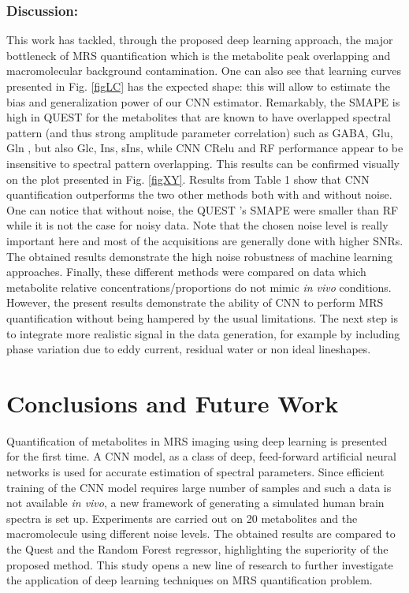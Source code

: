 \documentclass{llncs}
\begin{document}
\subsubsection{Discussion:}
This work has  tackled, through the proposed deep learning approach, the major bottleneck of MRS quantification which is the metabolite peak overlapping and macromolecular background contamination.
One can also see that learning curves presented in Fig. \ref{figLC} has the expected shape: this will allow to 
estimate the bias and generalization power of our CNN estimator.
Remarkably, the SMAPE is high in QUEST for the metabolites that are known to have overlapped spectral pattern (and thus strong amplitude parameter correlation) such as GABA, Glu, Gln , but also Glc, Ins, sIns,  while CNN CRelu and RF performance appear to be insensitive to spectral pattern overlapping. This results can be confirmed visually on the plot presented in Fig. \ref{figXY}.
Results from Table 1 show that CNN quantification outperforms the two other methods both with and without noise.
One can notice that without noise, the QUEST 's SMAPE were smaller than RF while it is not the case for noisy data. Note that the chosen noise level is really important here and most of the acquisitions are generally done with higher SNRs. The obtained results demonstrate the high noise robustness of machine learning approaches. Finally, these different methods were compared on data which metabolite relative concentrations/proportions do not mimic \textit{in vivo} conditions. However, the present results demonstrate the ability of CNN to perform MRS quantification without being hampered by the usual limitations. 
The next step is to integrate more realistic signal in the data generation, for example by including phase variation due to eddy current, residual water or non ideal lineshapes.

\section{Conclusions and Future Work}
Quantification of metabolites in MRS imaging using deep learning is presented for the first time. A CNN model, as a class of deep, feed-forward artificial neural networks is used for accurate estimation of spectral parameters. Since efficient training of the CNN model requires large number of samples and such a data is not available  \textit{in vivo}, a new framework of generating a simulated human brain spectra is set up. Experiments are carried out on 20 metabolites and the macromolecule using different noise levels. The obtained results are compared to the Quest and the Random Forest regressor, highlighting the superiority of the proposed method. This study opens a new line of research to further investigate the application of deep learning techniques on MRS quantification problem.
\end{document}
